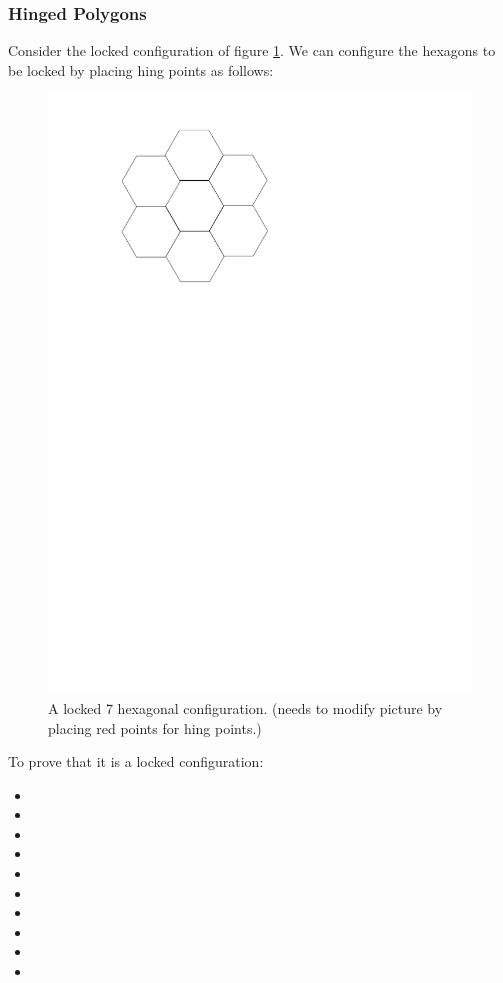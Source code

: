 \subsubsection{Hinged Polygons}
Consider the locked configuration of figure \ref{figure:7hexLocked}.  We can configure
the hexagons to be locked by placing hing points as follows:
\begin{figure}[h]
\begin{center}
\includegraphics[scale=.33]{graphics/7hexLocked.pdf}
\caption{A locked 7 hexagonal configuration.  (needs to modify picture by
placing red points for hing points.)}
\label{figure:7hexLocked}
\end{center} 
\end{figure}
To prove that it is a locked configuration:
\begin{itemize}
 \item[\rn{1}]
 \item[\rn{2}]
 \item[\rn{3}]
 \item[\rn{4}]
 \item[\rn{5}]
 \item[\rn{6}]
 \item[\rn{7}]
 \item[\rn{8}]
 \item[\rn{9}]
 \item[\rn{10}]
 \end{itemize}
